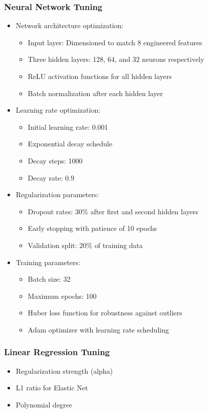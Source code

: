 \documentclass[twocolumn]{article}
\begin{document}
\subsubsection{Neural Network Tuning}
\begin{itemize}
    \item Network architecture optimization:
    \begin{itemize}
        \item Input layer: Dimensioned to match 8 engineered features
        \item Three hidden layers: 128, 64, and 32 neurons respectively
        \item ReLU activation functions for all hidden layers
        \item Batch normalization after each hidden layer
    \end{itemize}
    \item Learning rate optimization:
    \begin{itemize}
        \item Initial learning rate: 0.001
        \item Exponential decay schedule
        \item Decay steps: 1000
        \item Decay rate: 0.9
    \end{itemize}
    \item Regularization parameters:
    \begin{itemize}
        \item Dropout rates: 30\% after first and second hidden layers
        \item Early stopping with patience of 10 epochs
        \item Validation split: 20\% of training data
    \end{itemize}
    \item Training parameters:
    \begin{itemize}
        \item Batch size: 32
        \item Maximum epochs: 100
        \item Huber loss function for robustness against outliers
        \item Adam optimizer with learning rate scheduling
    \end{itemize}
\end{itemize}

\subsubsection{Linear Regression Tuning}
\begin{itemize}
    \item Regularization strength (alpha)
    \item L1 ratio for Elastic Net
    \item Polynomial degree
\end{itemize}
\end{document}
